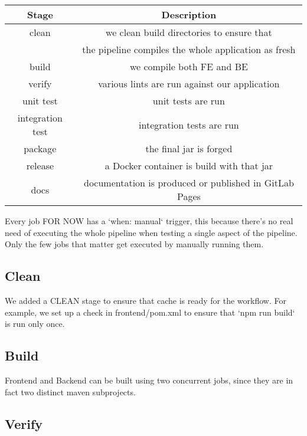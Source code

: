 \documentclass[a4paper,10pt]{scrartcl}
\begin{document}
\begin{center}
    \begin{tabular}{|c|c|}
        \hline
        Stage & Description \\
        \hline
        clean & we clean build directories to ensure that \\
        & the pipeline compiles the whole application as fresh \\
        \hline
        build & we compile both FE and BE \\
        \hline
        verify & various lints are run against our application \\
        \hline
        unit test & unit tests are run \\
        \hline
        integration test & integration tests are run \\
        \hline
        package & the final jar is forged \\
        \hline
        release & a Docker container is build with that jar \\
        \hline
        docs & documentation is produced or published in GitLab Pages \\
        \hline
    \end{tabular}
\end{center}

Every job FOR NOW has a `when: manual` trigger, this because there's no real need of executing the whole pipeline when testing a single aspect of the pipeline. Only the few jobs that matter get executed by manually running them.

\subsection{Clean}

We added a CLEAN stage to ensure that cache is ready for the workflow. For example, we set up a check in frontend/pom.xml to ensure that `npm run build` is run only once.

\subsection{Build}

Frontend and Backend can be built using two concurrent jobs, since they are in fact two distinct maven subprojects.

\subsection{Verify}
\end{document}
